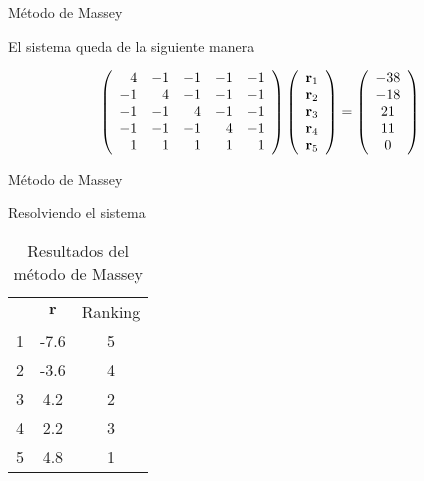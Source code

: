 \documentclass[10pt]{beamer}
\begin{document}
	\begin{frame}{Método de Massey}
		
		\begin{ejemplo}[continuación]
			El sistema queda de la siguiente manera
			
			\begin{equation*}
			\left(\begin{array}{r r r r r}
			4  & -1 & -1 & -1 & -1\\
			-1 &  4 & -1 & -1 & -1\\
			-1 & -1 &  4 & -1 & -1\\
			-1 & -1 & -1 &  4 & -1\\
			1 &  1 &  1 &  1 &  1 
			\end{array}\right)
			\left(\begin{array}{c}
			\mathbf{r}_1\\
			\mathbf{r}_2\\
			\mathbf{r}_3\\
			\mathbf{r}_4\\
			\mathbf{r}_5
			\end{array}\right)
			=
			\left(\begin{array}{c}
			-38\\
			-18\\
			21\\
			11\\
			0
			\end{array}\right)
			\end{equation*}
					
		\end{ejemplo}
		
	\end{frame}
	
		\begin{frame}{Método de Massey}
			
			\begin{ejemplo}[continuación]
				Resolviendo el sistema
				
				\begin{table}[h]
					\centering
					\caption{Resultados del método de Massey}
					\label{tbl:massey_resultados}
					\begin{tabular}{@{}ccc@{}}
						\cmidrule(l){2-3}
						& $\mathbf{r}$ & Ranking \\ \cmidrule(l){2-3} 
						1 & -7.6         & 5       \\ \midrule
						2 & -3.6         & 4       \\ \midrule
						3 & 4.2          & 2       \\ \midrule
						4 & 2.2          & 3       \\ \midrule
						5 & 4.8          & 1       \\ \bottomrule
					\end{tabular}
				\end{table}
				
				
			\end{ejemplo}
			
	\end{frame}
	
\end{document}
